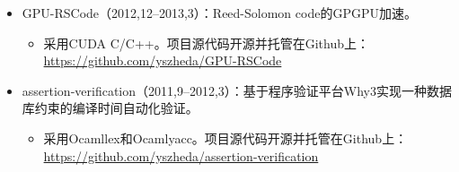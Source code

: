 \documentclass[letterpaper]{article}
\begin{document}
\begin{itemize}
    \item GPU-RSCode（2012,12--2013,3）：Reed-Solomon code的GPGPU加速。
        \begin{itemize}
            \item 采用CUDA C/C++。项目源代码开源并托管在Github上：\\
                \url{https://github.com/yszheda/GPU-RSCode}
        \end{itemize}
    \item assertion-verification（2011,9--2012,3）：基于程序验证平台Why3实现一种数据库约束的编译时间自动化验证。
        \begin{itemize}
            \item 采用Ocamllex和Ocamlyacc。项目源代码开源并托管在Github上：\\
                \url{https://github.com/yszheda/assertion-verification}
        \end{itemize}

\end{itemize}
\end{document}

